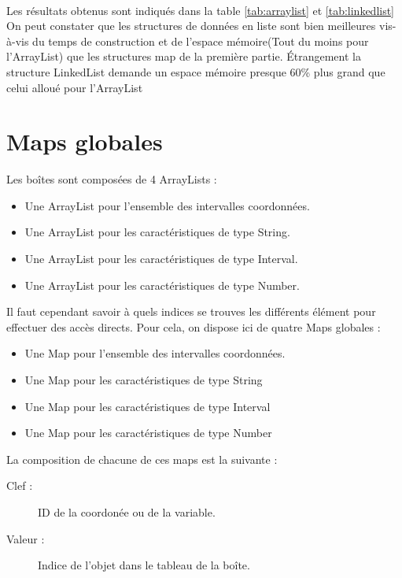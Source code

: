 \paragraph{}Les résultats obtenus sont indiqués dans la table \ref{tab:arraylist} et \ref{tab:linkedlist}
On peut constater que les structures de données en liste sont bien meilleures vis-à-vis du temps de construction et de l'espace mémoire(Tout du moins pour l'ArrayList) que les structures map de la première partie. Étrangement la structure LinkedList demande un espace mémoire presque 60\% plus grand que celui alloué pour l'ArrayList

\section{Maps globales}
Les boîtes sont composées  de 4 ArrayLists : 
\begin{itemize}
  \item Une ArrayList pour l'ensemble des intervalles coordonnées.
  \item Une ArrayList pour les caractéristiques de type String.
  \item Une ArrayList pour les caractéristiques de type Interval.
  \item Une ArrayList pour les caractéristiques de type Number.
\end{itemize}
Il faut cependant savoir à quels indices se trouves les différents élément pour effectuer des accès directs. Pour cela, on dispose ici de quatre Maps globales :
\begin{itemize}
  \item Une Map pour l'ensemble des intervalles coordonnées.
  \item Une Map pour les caractéristiques de type String
  \item Une Map pour les caractéristiques de type Interval
  \item Une Map pour les caractéristiques de type Number
\end{itemize}
La composition de chacune de ces maps est la suivante :  
\begin{description}
 \item[Clef :]
ID de la coordonée ou de la variable.
\item[Valeur :]
Indice de l'objet dans le tableau de la boîte.
\end{description}


